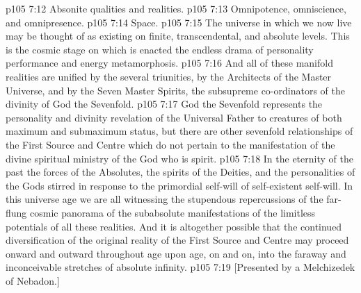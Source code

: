 \vs p105 7:12 \bibnobreakspace Absonite qualities and realities.
\vs p105 7:13 \bibnobreakspace Omnipotence, omniscience, and omnipresence.
\vs p105 7:14 \bibnobreakspace Space.
\vs p105 7:15 \pc The universe in which we now live may be thought of as existing on finite, transcendental, and absolute levels. This is the cosmic stage on which is enacted the endless drama of personality performance and energy metamorphosis.
\vs p105 7:16 And all of these manifold realities are unified  by the several triunities,  by the Architects of the Master Universe, and  by the Seven Master Spirits, the subsupreme co\hyp{}ordinators of the divinity of God the Sevenfold.
\vs p105 7:17 God the Sevenfold represents the personality and divinity revelation of the Universal Father to creatures of both maximum and submaximum status, but there are other sevenfold relationships of the First Source and Centre which do not pertain to the manifestation of the divine spiritual ministry of the God who is spirit.
\vs p105 7:18 \pc In the eternity of the past the forces of the Absolutes, the spirits of the Deities, and the personalities of the Gods stirred in response to the primordial self\hyp{}will of self\hyp{}existent self\hyp{}will. In this universe age we are all witnessing the stupendous repercussions of the far\hyp{}flung cosmic panorama of the subabsolute manifestations of the limitless potentials of all these realities. And it is altogether possible that the continued diversification of the original reality of the First Source and Centre may proceed onward and outward throughout age upon age, on and on, into the faraway and inconceivable stretches of absolute infinity.
\vsetoff
\vs p105 7:19 [Presented by a Melchizedek of Nebadon.]
\quizlink
